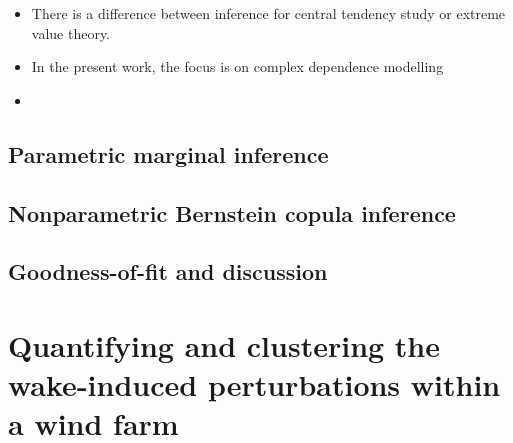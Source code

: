 \begin{itemize}
    \item There is a difference between inference for central tendency study or extreme value theory. 
    \item In the present work, the focus is on complex dependence modelling
    \item 
\end{itemize}




\subsection{Parametric marginal inference}



\subsection{Nonparametric Bernstein copula inference}



\subsection{Goodness-of-fit and discussion}



\newpage
\section{Quantifying and clustering the wake-induced perturbations within a wind farm}


